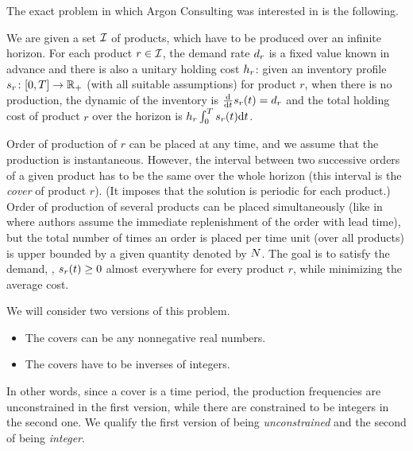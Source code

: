 The exact problem in which Argon Consulting was interested in is the following.

We are given a set $\mathcal{I}$ of products, which have to be produced over an infinite horizon. For each product $r\in\mathcal{I}$, the demand rate $d_r$ is a fixed value known in advance and there is also a unitary holding cost $h_r$: given an inventory profile $s_r\colon[0,T]\rightarrow\mathbb{R}_+$ (with all suitable assumptions) for product $r$, when there is no production, the dynamic of the inventory is $\frac{\mathrm{d}}{\mathrm{d} t}s_r(t)=d_r$ and the total holding cost of product $r$ over the horizon is $h_r\int_0^{T}s_r(t)\mathrm{d} t$.

Order of production of $r$ can be placed at any time, and we assume that the production is instantaneous. However, the interval between two successive orders of a given product has to be the same over the whole horizon (this interval is the {\em cover} of product $r$). (It imposes that the solution is periodic for each product.) Order of production of several products can be placed simultaneously (like in~\cite{Ohno2001} where authors assume the immediate replenishment of the order with lead time), but the total number of times an order is placed per time unit (over all products) is upper bounded by a given quantity denoted by $N$. The goal is to satisfy the demand, \ie, $s_r(t)\geq 0$ almost everywhere for every product $r$, while minimizing the average cost.


We will consider two versions of this problem.
\begin{itemize}
  \item The covers can be any nonnegative real numbers.
  \item The covers have to be inverses of integers.
\end{itemize}
In other words, since a cover is a time period, the production frequencies are unconstrained in the first version, while there are constrained to be integers in the second one. We qualify the first version of being {\em unconstrained} and the second of being {\em integer}.



